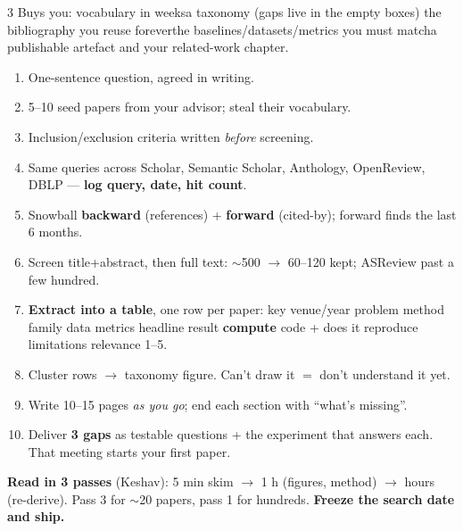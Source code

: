 \documentclass[10pt,a4paper]{article}
\begin{document}
\begin{multicols}{3}
Buys you: vocabulary in weeks\dt a taxonomy (gaps live in the empty boxes)\dt
the bibliography you reuse forever\dt the baselines/datasets/metrics you must
match\dt a publishable artefact and your related-work chapter.
\begin{enumerate}
  \item One-sentence question, agreed in writing.
  \item 5--10 seed papers from your advisor; steal their vocabulary.
  \item Inclusion/exclusion criteria written \emph{before} screening.
  \item Same queries across Scholar, Semantic Scholar, Anthology, OpenReview,
        DBLP --- \textbf{log query, date, hit count}.
  \item Snowball \textbf{backward} (references) + \textbf{forward} (cited-by);
        forward finds the last 6 months.
  \item Screen title+abstract, then full text: $\sim$500 $\to$ 60--120 kept;
        ASReview past a few hundred.
  \item \textbf{Extract into a table}, one row per paper: key \textbar{}
        venue/year \textbar{} problem \textbar{} method family \textbar{} data
        \textbar{} metrics \textbar{} headline result \textbar{}
        \textbf{compute} \textbar{} code + does it reproduce \textbar{}
        limitations \textbar{} relevance 1--5.
  \item Cluster rows $\to$ taxonomy figure. Can't draw it $=$ don't understand
        it yet.
  \item Write 10--15 pages \emph{as you go}; end each section with ``what's
        missing''.
  \item Deliver \textbf{3 gaps} as testable questions + the experiment that
        answers each. That meeting starts your first paper.
\end{enumerate}
\begin{flag}
\textbf{Read in 3 passes} (Keshav): 5 min skim $\to$ 1 h (figures, method)
$\to$ hours (re-derive). Pass 3 for $\sim$20 papers, pass 1 for hundreds.
\textbf{Freeze the search date and ship.}
\end{flag}


\end{multicols}
\end{document}
